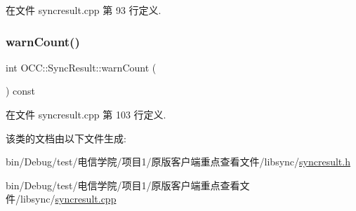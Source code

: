 在文件 syncresult.\+cpp 第 93 行定义.

\mbox{\label{class_o_c_c_1_1_sync_result_af93b3d0c9ed0a6411e12c6d5bb070618}} 
\subsubsection{\texorpdfstring{warn\+Count()}{warnCount()}}
{\footnotesize\ttfamily int O\+C\+C\+::\+Sync\+Result\+::warn\+Count (\begin{DoxyParamCaption}{ }\end{DoxyParamCaption}) const}



在文件 syncresult.\+cpp 第 103 行定义.



该类的文档由以下文件生成\+:\begin{DoxyCompactItemize}
\item 
bin/\+Debug/test/电信学院/项目1/原版客户端重点查看文件/libsync/\hyperlink{syncresult_8h}{syncresult.\+h}\item 
bin/\+Debug/test/电信学院/项目1/原版客户端重点查看文件/libsync/\hyperlink{syncresult_8cpp}{syncresult.\+cpp}\end{DoxyCompactItemize}
